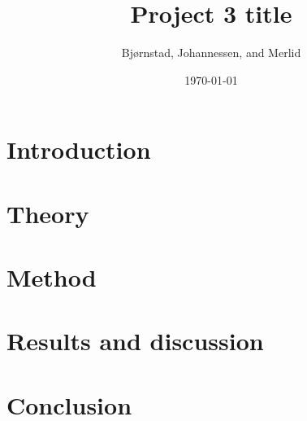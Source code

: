 \documentclass[aps,rmp,reprint,amsmath,amssymb,twocolumn,floatfix]{revtex4-1}
\begin{document}
\title{Project 3 title}

\author{Bjørnstad, Johannessen, and Merlid}
\date{\today}


\begin{abstract}

\end{abstract}
\maketitle

\tableofcontents

\section{Introduction}
\label{sec:introduction}

\section{Theory}


\section{Method}


\section{Results and discussion}


%

\section{Conclusion}


\clearpage
{} %


\clearpage
\appendix
\label{appendix}

\clearpage
\end{document}
